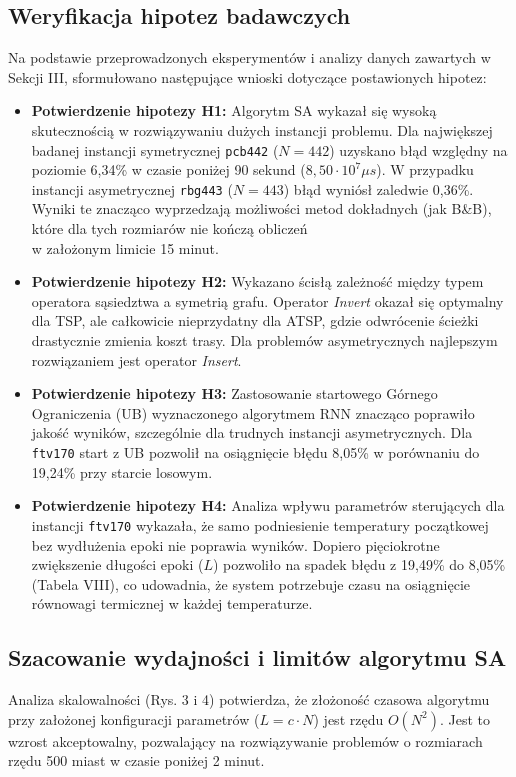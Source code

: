 \documentclass[conference]{IEEEtran}
\begin{document}
        \subsection{Weryfikacja hipotez badawczych}
            Na podstawie przeprowadzonych eksperymentów i analizy danych zawartych w Sekcji III, sformułowano następujące wnioski dotyczące postawionych hipotez:
            \begin{itemize}
                \item \textbf{Potwierdzenie hipotezy H1:} Algorytm SA wykazał się wysoką skutecznością w rozwiązywaniu dużych instancji problemu. Dla największej badanej instancji symetrycznej \texttt{pcb442} ($N=442$) uzyskano błąd względny na poziomie 6,34\% w czasie poniżej 90 sekund ($8,50 \cdot 10^7 \mu s$). W przypadku instancji asymetrycznej \texttt{rbg443} ($N=443$) błąd wyniósł zaledwie 0,36\%. Wyniki te znacząco wyprzedzają możliwości metod dokładnych (jak B\&B), które dla tych rozmiarów nie kończą obliczeń \\ w założonym limicie 15 minut.
                \item \textbf{Potwierdzenie hipotezy H2:} Wykazano ścisłą zależność między typem operatora sąsiedztwa a symetrią grafu. Operator \textit{Invert} okazał się optymalny dla TSP, ale całkowicie nieprzydatny dla ATSP, gdzie odwrócenie ścieżki drastycznie zmienia koszt trasy. Dla problemów asymetrycznych najlepszym rozwiązaniem jest operator \textit{Insert}.
                \item \textbf{Potwierdzenie hipotezy H3:} Zastosowanie startowego Górnego Ograniczenia (UB) wyznaczonego algorytmem RNN znacząco poprawiło jakość wyników, szczególnie dla trudnych instancji asymetrycznych. Dla \texttt{ftv170} start z UB pozwolił na osiągnięcie błędu 8,05\% w porównaniu do 19,24\% przy starcie losowym.
                \item \textbf{Potwierdzenie hipotezy H4:} Analiza wpływu parametrów sterujących dla instancji \texttt{ftv170} wykazała, że samo podniesienie temperatury początkowej bez wydłużenia epoki nie poprawia wyników. Dopiero pięciokrotne zwiększenie długości epoki ($L$) pozwoliło na spadek błędu z 19,49\% do 8,05\% (Tabela VIII), co udowadnia, że system potrzebuje czasu na osiągnięcie równowagi termicznej w każdej temperaturze.
            \end{itemize}
        \subsection{Szacowanie wydajności i limitów algorytmu SA}
            Analiza skalowalności (Rys. 3 i 4) potwierdza, że złożoność czasowa algorytmu przy założonej konfiguracji parametrów ($L=c \cdot N$) jest rzędu $O(N^2)$. Jest to wzrost akceptowalny, pozwalający na rozwiązywanie problemów o rozmiarach rzędu 500 miast w czasie poniżej 2 minut.
\end{document}
